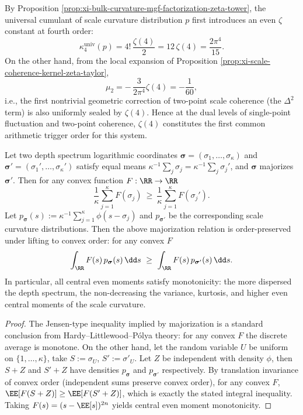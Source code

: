 \begin{remark}[\texorpdfstring{$q=4$}{q=4} resonance threshold for \texorpdfstring{$\zeta$}{zeta}: \texorpdfstring{$\zeta(4)$}{zeta(4)} as first trigger order for both single-point non-Gaussianity and two-point coherence]\label{rem:xi-zeta4-resonance-threshold}
By Proposition \ref{prop:xi-bulk-curvature-mgf-factorization-zeta-tower}, the universal cumulant of scale curvature distribution \(p\) first introduces an even \(\zeta\) constant at fourth order:
\[
\kappa_{4}^{\mathrm{univ}}(p)=4!\,\frac{\zeta(4)}{2}=12\,\zeta(4)=\frac{2\pi^4}{15}.
\]
On the other hand, from the local expansion of Proposition \ref{prop:xi-scale-coherence-kernel-zeta-taylor},
\[
\mu_{2}=-\,\frac{3}{2\pi^{4}}\zeta(4)=-\frac{1}{60},
\]
i.e., the first nontrivial geometric correction of two-point scale coherence (the \(\Delta^2\) term) is also uniformly sealed by \(\zeta(4)\).
Hence at the dual levels of single-point fluctuation and two-point coherence, \(\zeta(4)\) constitutes the first common arithmetic trigger order for this system.
\end{remark}

\begin{proposition}\label{prop:xi-depth-spectrum-majorization-convex-order}
Let two depth spectrum logarithmic coordinates
\(
\boldsymbol{\sigma}=(\sigma_1,\dots,\sigma_\kappa)
\)
and
\(
\boldsymbol{\sigma}'=(\sigma_1',\dots,\sigma_\kappa')
\)
satisfy equal means
\(
\kappa^{-1}\sum_j\sigma_j=\kappa^{-1}\sum_j\sigma_j'
\),
and \(\boldsymbol{\sigma}\) majorizes \(\boldsymbol{\sigma}'\).
Then for any convex function \(F:\RR\to\RR\)
\[
\frac{1}{\kappa}\sum_{j=1}^{\kappa}F(\sigma_j)\ \ge\ \frac{1}{\kappa}\sum_{j=1}^{\kappa}F(\sigma_j').
\]
Let \(p_{\boldsymbol{\sigma}}(s):=\kappa^{-1}\sum_{j=1}^{\kappa}\phi(s-\sigma_j)\) and \(p_{\boldsymbol{\sigma}'}\) be the corresponding scale curvature distributions.
Then the above majorization relation is order-preserved under lifting to convex order: for any convex \(F\)
\[
\int_{\RR}F(s)\,p_{\boldsymbol{\sigma}}(s)\,\dd s\ \ge\ \int_{\RR}F(s)\,p_{\boldsymbol{\sigma}'}(s)\,\dd s.
\]
In particular, all central even moments satisfy monotonicity: the more dispersed the depth spectrum, the non-decreasing the variance, kurtosis, and higher even central moments of the scale curvature.
\end{proposition}
\begin{proof}
The Jensen-type inequality implied by majorization is a standard conclusion from Hardy--Littlewood--Pólya theory: for any convex \(F\) the discrete average is monotone.
On the other hand, let the random variable \(U\) be uniform on \(\{1,\dots,\kappa\}\), take \(S:=\sigma_U\), \(S':=\sigma'_U\).
Let \(Z\) be independent with density \(\phi\), then \(S+Z\) and \(S'+Z\) have densities \(p_{\boldsymbol{\sigma}}\) and \(p_{\boldsymbol{\sigma}'}\) respectively.
By translation invariance of convex order (independent sums preserve convex order), for any convex \(F\),
\(
\EE[F(S+Z)]\ge \EE[F(S'+Z)]
\),
which is exactly the stated integral inequality.
Taking \(F(s)=(s-\EE[s])^{2n}\) yields central even moment monotonicity.
\end{proof}

